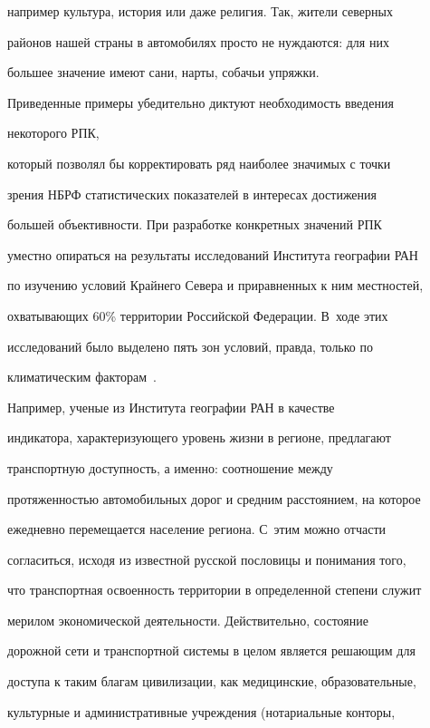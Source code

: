 например культура, история или даже религия. Так, жители северных


районов нашей страны в автомобилях просто не нуждаются: для них


большее значение имеют сани, нарты, собачьи упряжки.





    Приведенные примеры убедительно диктуют необходимость введения


некоторого  РПК,


который позволял бы корректировать ряд наиболее значимых с точки


зрения НБРФ статистических показателей в интересах достижения


большей объективности. При разработке конкретных значений РПК


уместно опираться на результаты исследований Института географии РАН


по изучению условий Крайнего Севера и приравненных к ним местностей,


охватывающих 60\% территории Российской Федерации. В~ходе этих


исследований было выделено пять зон условий, правда, только по


климатическим факторам~\cite{2-luc}.





    Например, ученые из Института географии РАН в качестве


индикатора, характеризующего уровень жизни в регионе, предлагают


транспортную доступность, а именно: соотношение между


протяженностью автомобильных дорог и средним расстоянием, на которое


ежедневно перемещается население региона. С~этим можно отчасти


согласиться, исходя из известной русской пословицы и понимания того,


что транспортная освоенность территории в определенной степени служит


мерилом экономической деятельности. Действительно, состояние


дорожной сети и транспортной системы в целом является решающим для


доступа к таким благам цивилизации, как медицинские, образовательные,


культурные и административные учреждения (нотариальные конторы,


